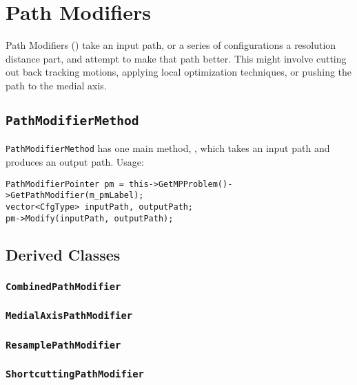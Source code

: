 \chapter{Path Modifiers}

Path Modifiers (\pam) take an input path, or a series of configurations a
resolution distance part, and attempt to make that path better. This might
involve cutting out back tracking motions, applying local optimization
techniques, or pushing the path to the medial axis.

\section{\texttt{PathModifierMethod}}

\texttt{PathModifierMethod} has one main method, , which takes an
input path and produces an output path. Usage:
\begin{lstlisting}
PathModifierPointer pm = this->GetMPProblem()->GetPathModifier(m_pmLabel);
vector<CfgType> inputPath, outputPath;
pm->Modify(inputPath, outputPath);
\end{lstlisting}

\section{Derived Classes}

\subsection{\texttt{CombinedPathModifier}}

\subsection{\texttt{MedialAxisPathModifier}}

\subsection{\texttt{ResamplePathModifier}}

\subsection{\texttt{ShortcuttingPathModifier}}
